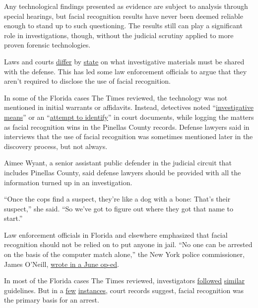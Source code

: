 Any technological findings presented as evidence are subject to analysis
through special hearings, but facial recognition results have never been
deemed reliable enough to stand up to such questioning. The results
still can play a significant role in investigations, though, without the
judicial scrutiny applied to more proven forensic technologies.

Laws and courts
\href{https://law.justia.com/cases/new-jersey/appellate-division-published/1992/254-n-j-super-754-1.html}{differ}
by \href{http://fprints.nwlean.net/Brady.pdf}{state} on what
investigative materials must be shared with the defense. This has led
some law enforcement officials to argue that they aren't required to
disclose the use of facial recognition.

In some of the Florida cases The Times reviewed, the technology was not
mentioned in initial warrants or affidavits. Instead, detectives noted
``\href{https://www.documentcloud.org/documents/6586485-Kohlsshoplifting-Redacted.html}{investigative
means}'' or an
``\href{https://www.documentcloud.org/documents/6591394-PasadenaLiquors-Redacted.html}{attempt
to identify}'' in court documents, while logging the matters as facial
recognition wins in the Pinellas County records. Defense lawyers said in
interviews that the use of facial recognition was sometimes mentioned
later in the discovery process, but not always.

Aimee Wyant, a senior assistant public defender in the judicial circuit
that includes Pinellas County, said defense lawyers should be provided
with all the information turned up in an investigation.

``Once the cops find a suspect, they're like a dog with a bone: That's
their suspect,'' she said. ``So we've got to figure out where they got
that name to start.''

Law enforcement officials in Florida and elsewhere emphasized that
facial recognition should not be relied on to put anyone in jail. ``No
one can be arrested on the basis of the computer match alone,'' the New
York police commissioner, James O'Neill,
\href{https://www.nytimes3xbfgragh.onion/2019/06/09/opinion/facial-recognition-police-new-york-city.html}{wrote
in a June op-ed}.

In most of the Florida cases The Times reviewed, investigators
\href{https://www.documentcloud.org/documents/6591395-Armedrobbery-Redacted.html}{followed}
\href{https://www.documentcloud.org/documents/6591396-Shoes-Redacted.html}{similar}
guidelines. But in a
\href{https://www.documentcloud.org/documents/6586485-Kohlsshoplifting-Redacted.html}{few}
\href{https://www.documentcloud.org/documents/6587265-Shoesshoplifting-Redacted.html}{instances},
court records suggest, facial recognition was the primary basis for an
arrest.

